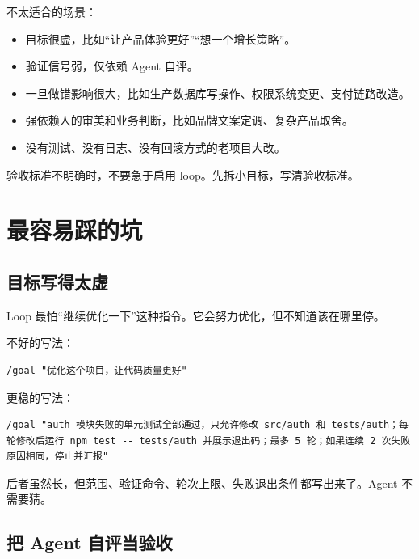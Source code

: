 \documentclass[9pt,a4paper,twocolumn]{ctexart}
\begin{document}
不太适合的场景：


\begin{itemize}[itemsep=1pt, topsep=2pt]
  \item 目标很虚，比如“让产品体验更好”“想一个增长策略”。
  \item 验证信号弱，仅依赖 Agent 自评。
  \item 一旦做错影响很大，比如生产数据库写操作、权限系统变更、支付链路改造。
  \item 强依赖人的审美和业务判断，比如品牌文案定调、复杂产品取舍。
  \item 没有测试、没有日志、没有回滚方式的老项目大改。
\end{itemize}


验收标准不明确时，不要急于启用 loop。先拆小目标，写清验收标准。



\section*{最容易踩的坑}


\subsection*{目标写得太虚}


Loop 最怕“继续优化一下”这种指令。它会努力优化，但不知道该在哪里停。



不好的写法：



\begin{lstlisting}
/goal "优化这个项目，让代码质量更好"
\end{lstlisting}



更稳的写法：



\begin{lstlisting}
/goal "auth 模块失败的单元测试全部通过，只允许修改 src/auth 和 tests/auth；每轮修改后运行 npm test -- tests/auth 并展示退出码；最多 5 轮；如果连续 2 次失败原因相同，停止并汇报"
\end{lstlisting}



后者虽然长，但范围、验证命令、轮次上限、失败退出条件都写出来了。Agent 不需要猜。



\subsection*{把 Agent 自评当验收}
\end{document}
